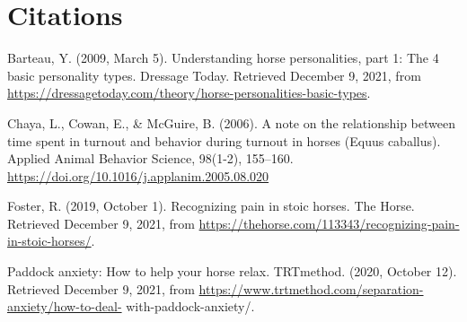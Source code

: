 \documentclass[
]{article}
\begin{document}
\hypertarget{citations}{%
\section{Citations}\label{citations}}

Barteau, Y. (2009, March 5). Understanding horse personalities, part 1:
The 4 basic personality types. Dressage Today. Retrieved December 9,
2021, from
\url{https://dressagetoday.com/theory/horse-personalities-basic-types}.

Chaya, L., Cowan, E., \& McGuire, B. (2006). A note on the relationship
between time spent in turnout and behavior during turnout in horses
(Equus caballus). Applied Animal Behavior Science, 98(1-2), 155--160.
\url{https://doi.org/10.1016/j.applanim.2005.08.020}

Foster, R. (2019, October 1). Recognizing pain in stoic horses. The
Horse. Retrieved December 9, 2021, from
\url{https://thehorse.com/113343/recognizing-pain-in-stoic-horses/}.

Paddock anxiety: How to help your horse relax. TRTmethod. (2020, October
12). Retrieved December 9, 2021, from
\url{https://www.trtmethod.com/separation-anxiety/how-to-deal-}
with-paddock-anxiety/.
\end{document}
